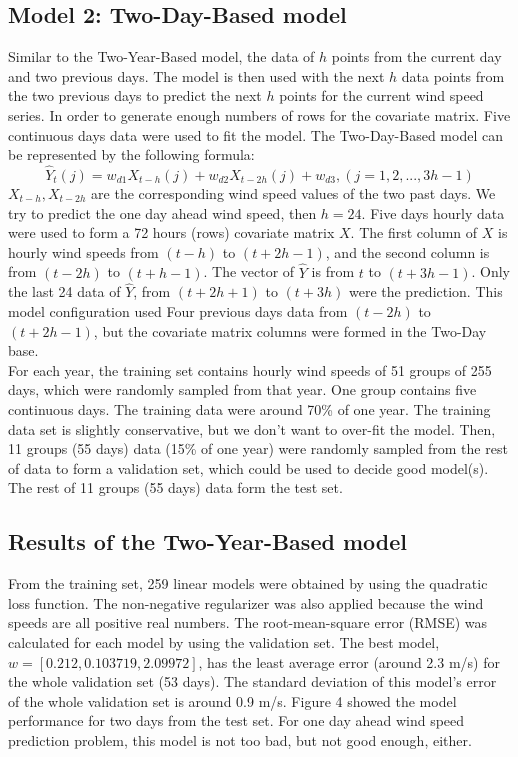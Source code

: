 \documentclass{article}
\begin{document}
\subsection*{Model 2: Two-Day-Based model}
Similar to the Two-Year-Based model, the data of  $h$ points from the
current day and two previous days.  The model is then used with the next $h$ data points from the two previous days to predict the next  $h$ points for the current wind speed series. In order to generate enough numbers of rows for the covariate matrix.  Five continuous days data were used to fit the model.  The Two-Day-Based model can be represented by the following formula: \\
\begin{equation*}
\hat{Y}_t(j) = w_{d1}X_{t-h}(j) + w_{d2} X_{t-2h}(j) +w_{d3}, (j = 1, 2, ... , 3h-1)
\end{equation*}
$X_{t-h}, X_{t-2h}$ are the corresponding wind speed values of the two past days. We try to predict the one day ahead wind speed, then $h=24$.  Five days hourly data  were used to form a 72 hours (rows) covariate matrix $X$.  The first column of $X$ is hourly wind speeds from $(t-h)$ to $(t+2h-1)$, and the second column is from $(t-2h)$ to $(t+h-1)$.  The vector of $\hat{Y}$ is from $t$ to $(t+3h-1)$. Only the last 24 data of $\hat{Y}$, from $(t+2h+1)$ to $(t+3h)$ were the prediction.  This model configuration used Four previous days data from $(t-2h)$ to $(t+2h-1)$, but the covariate matrix columns were formed in the Two-Day base. \\
For each year, the training set contains hourly wind speeds of 51 groups of 255 days, which were randomly sampled from that year.  One group contains five continuous days.  The training data were around 70\%   of one year.  The training data set is slightly conservative, but we don't want to over-fit the model.  Then, 11 groups (55 days) data (15\% of one year) were randomly sampled from the rest of data to form a validation set, which could be used to decide good model(s).  The rest of 11 groups (55 days) data form the test set.\\

\subsection*{Results of the Two-Year-Based model}
From the training set, 259 linear models were obtained by using the quadratic loss function.  The non-negative regularizer was also applied because the wind speeds are all positive real numbers.  The root-mean-square error (RMSE) was calculated for each model by using the validation set.  The best model, $w=[0.212, 0.103719, 2.09972]$, has the least average error (around 2.3 m/s) for the whole validation set (53 days).  The standard deviation of this model's error of the whole validation set is around 0.9 m/s.  Figure 4 showed the model performance for two days from the test set.  For one day ahead wind speed prediction problem, this model is not too bad, but not good enough, either.
\end{document}
